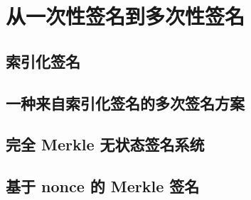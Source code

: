 \section{从一次性签名到多次性签名}\label{sec:14-6}

\subsection{索引化签名}\label{subsec:14-6-1}

\begin{definition}\label{def:14-6}
	
\end{definition}

\subsection{一种来自索引化签名的多次签名方案}\label{subsec:14-6-2}

\subsection{完全 Merkle 无状态签名系统}\label{subsec:14-6-3}

\begin{theorem}\label{theo:14-6}
	
\end{theorem}

\subsection{基于 nonce 的 Merkle 签名}\label{subsec:14-6-4}
